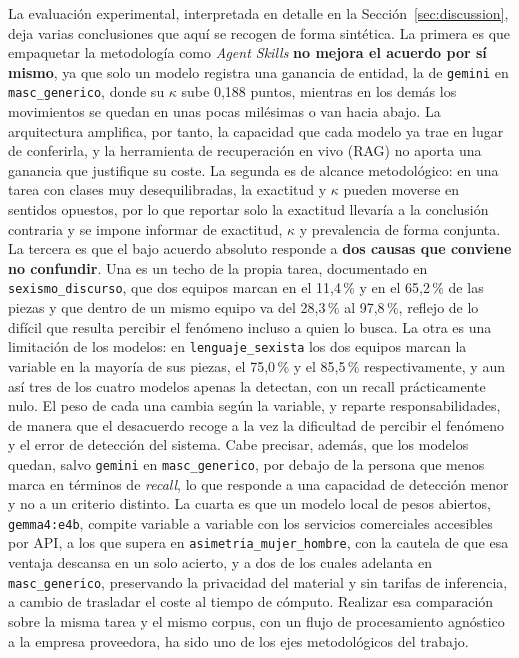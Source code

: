 La evaluación experimental, interpretada en detalle en la Sección~\ref{sec:discussion},
deja varias conclusiones que aquí se recogen de forma sintética. La primera es que
empaquetar la metodología como \textit{Agent Skills} \textbf{no mejora el acuerdo por
sí mismo}, ya que solo un modelo registra una ganancia de entidad, la de
\texttt{gemini} en \texttt{masc\_generico}, donde su $\kappa$ sube 0,188 puntos,
mientras en los demás los movimientos se quedan en unas pocas milésimas o van hacia
abajo. La arquitectura amplifica, por tanto, la capacidad que cada modelo ya trae en
lugar de conferirla, y la herramienta de recuperación en vivo (RAG) no aporta una
ganancia que justifique su coste. La segunda es de alcance metodológico: en una tarea con
clases muy desequilibradas, la exactitud y $\kappa$ pueden moverse en sentidos opuestos,
por lo que reportar solo la exactitud llevaría a la conclusión contraria y se impone
informar de exactitud, $\kappa$ y prevalencia de forma conjunta. La tercera es que el
bajo acuerdo absoluto responde a \textbf{dos causas que conviene no confundir}. Una es
un techo de la propia tarea, documentado en \texttt{sexismo\_discurso}, que dos equipos
marcan en el 11,4\,\% y en el 65,2\,\% de las piezas y que dentro de un mismo equipo va
del 28,3\,\% al 97,8\,\%, reflejo de lo difícil que resulta percibir el fenómeno incluso
a quien lo busca. La otra es una limitación de los modelos: en \texttt{lenguaje\_sexista} los dos
equipos marcan la variable en la mayoría de sus piezas, el 75,0\,\% y el 85,5\,\%
respectivamente, y aun así tres de los cuatro modelos apenas la detectan, con un
recall prácticamente nulo. El peso de cada una cambia según la variable, y reparte responsabilidades, de
manera que el desacuerdo recoge a la vez la dificultad de percibir el fenómeno y el
error de detección del sistema. Cabe
precisar, además, que los modelos quedan, salvo \texttt{gemini} en
\texttt{masc\_generico}, por debajo de la persona que menos marca en términos de \textit{recall}, lo que responde a
una capacidad de detección menor y no a un criterio distinto. La cuarta es que un modelo local
de pesos abiertos, \texttt{gemma4:e4b}, compite variable a variable con los servicios
comerciales accesibles por API, a los que supera en \texttt{asimetria\_mujer\_hombre}, con la cautela de que esa
ventaja descansa en un solo acierto, y a dos de los cuales adelanta en
\texttt{masc\_generico}, preservando la privacidad del material y sin
tarifas de inferencia, a cambio de trasladar el coste al tiempo de cómputo. Realizar esa comparación sobre la misma tarea y el mismo corpus, con un flujo de procesamiento agnóstico a la
empresa proveedora, ha sido uno de los ejes metodológicos del trabajo.

